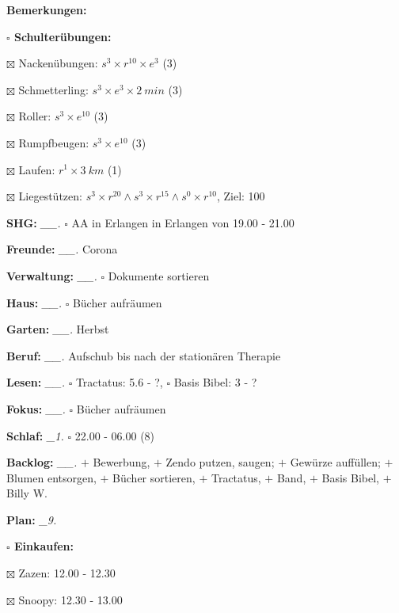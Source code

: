 \documentclass[10pt,a4paper]{article}
\newcommand\prop[1] {{\color {alizarin} {\bf #1}}}        %
\newcommand\mand[1] {{\color {burntorange} {\bf #1}}}     %
\newcommand\topspace{\vskip -15pt \hskip 20pt}
\newcommand\bottomspace{\vskip 4pt}
\newcommand\n[1] { {\sl #1.} \hskip 5pt }
\begin{document}
\begin{mdframed}[style=daystyle]
\begin{labeling}{{\mand {Bemerkungen:}}}
\begin{minipage}{0.75\textwidth}
\begin{labeling}{\prop {$\square$ {Schulterübungen:}}}
      \item[$\boxtimes$ Nackenübungen:]   $s^3 \times r^{10} \times e^3$ (3)
      \item[$\boxtimes$ Schmetterling:]   $s^3 \times e^3 \times 2\ min$ (3)
      \item[$\boxtimes$ Roller:]          $s^3 \times e^{10}$ (3)
      \item[$\boxtimes$ Rumpfbeugen:]     $s^3 \times e^{10}$ (3)
      \item[$\boxtimes$ Laufen:]          $r^1 \times 3\ km$ (1)
      \item[$\boxtimes$ Liegestützen:]    $s^3 \times r^{20} \land s^3 \times r^{15} \land s^0 \times r^{10}$, Ziel: 100
      \end{labeling}
    \end{minipage}
    \bottomspace        
  \item[{\mand {SHG:}}]          \n{\_\_} $\square$ AA in Erlangen in Erlangen von 19.00 - 21.00
  \item[{\mand {Freunde:}}]      \n{\_\_} Corona
  \item[{\mand {Verwaltung:}}]   \n{\_\_} $\square$ Dokumente sortieren
  \item[{\mand {Haus:}}]         \n{\_\_} $\square$ Bücher aufräumen
  \item[{\mand {Garten:}}]       \n{\_\_} Herbst
  \item[{\mand {Beruf:}}]        \n{\_\_} Aufschub bis nach der stationären Therapie
  \item[{\mand {Lesen:}}]        \n{\_\_} $\square$ Tractatus: 5.6 - ?, $\square$ Basis Bibel: 3 - ?
  \item[{\mand {Fokus:}}]        \n{\_\_} $\square$ Bücher aufräumen
  \item[{\mand {Schlaf:}}]        \n{\_1} $\square$ 22.00 - 06.00 (8)
  \item[{\mand {Backlog:}}]      \n{\_\_} 
    $+$ Bewerbung,
    $+$ Zendo putzen, saugen; $+$ Gewürze auffüllen; $+$ Blumen entsorgen, $+$ Bücher sortieren,
    $+$ Tractatus, $+$ Band, $+$ Basis Bibel, $+$ Billy W.  
  \item[{\mand {Plan:}}]          \n{\_9}
    \topspace
    \begin{minipage}{0.75\textwidth}  
      \begin{labeling}{\prop {$\square$ {Einkaufen:}}} 
        \setlength\itemsep{-3pt}
      \item[$\boxtimes$ Zazen:]     12.00 - 12.30
      \item[$\boxtimes$ Snoopy:]    12.30 - 13.00

\end{labeling}
\end{minipage}
\end{labeling}
\end{mdframed}
\end{document}
